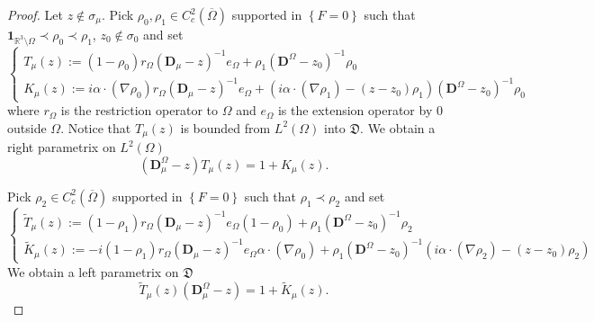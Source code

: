 \documentclass[a4paper, 12pt]{amsart}
\numberwithin{equation}{section}
\newcommand{\R}{\mathbb{R}} %
\newcommand{\lp}{\left(} %
\newcommand{\rp}{\right)} %
\newcommand{\lcb}{\left\lbrace} %
\newcommand{\rcb}{\right\rbrace} %
\newcommand{\indic}{\mathbf{1}} %
\newcommand{\Dvec}{\mathbf{D}}
\newcommand{\Dfrak}{\mathfrak{D}}
\begin{document}
\begin{proof} 
    Let $z\not\in\sigma_\mu$. Pick $\rho_0,\rho_1\in C^2_c(\overline{\Omega})$ supported in $\lcb F=0\rcb$ such that $\indic_{\R^3\setminus\Omega}\prec\rho_0\prec\rho_1$, $z_0\not\in\sigma_0$ and set
    \begin{equation*}
        \left\{
        \begin{array}{ll}
            T_\mu(z):=(1-\rho_0)r_\Omega(\Dvec_\mu-z)^{-1}e_\Omega+\rho_1(\Dvec^\Omega-z_0)^{-1}\rho_0\\
            
            K_\mu(z):=i\alpha\cdot(\nabla\rho_0)r_\Omega(\Dvec_\mu-z)^{-1}e_\Omega+\lp i\alpha\cdot(\nabla\rho_1)-(z-z_0)\rho_1\rp(\Dvec^\Omega-z_0)^{-1}\rho_0
        \end{array}
        \right.
    \end{equation*}
    where $r_\Omega$ is the restriction operator to $\Omega$ and $e_\Omega$ is the extension operator by $0$ outside $\Omega$. Notice that $T_\mu(z)$ is bounded from $L^2(\Omega)$ into $\Dfrak$. We obtain a right parametrix on $L^2(\Omega)$
    \begin{equation}\label{RightParametrix}
        (\Dvec_\mu^\Omega-z)T_\mu(z)=1+K_\mu(z).
    \end{equation}

    Pick $\rho_2\in C^2_c(\overline{\Omega})$ supported in $\lcb F=0\rcb$ such that $\rho_1\prec\rho_2$ and set 
    \begin{equation*}
        \left\{
        \begin{array}{ll}
            \tilde{T}_\mu(z):=(1-\rho_1)r_\Omega(\Dvec_\mu-z)^{-1}e_\Omega(1-\rho_0)+\rho_1(\Dvec^\Omega-z_0)^{-1}\rho_2\\
            
            \tilde{K}_\mu(z):=-i(1-\rho_1)r_\Omega(\Dvec_\mu-z)^{-1}e_\Omega\alpha\cdot(\nabla\rho_0)+\rho_1(\Dvec^\Omega-z_0)^{-1}\lp i\alpha\cdot(\nabla\rho_2)-(z-z_0)\rho_2\rp
        \end{array}
        \right.
    \end{equation*}
    We obtain a left parametrix on $\Dfrak$
    \begin{equation}\label{LeftParametrix}
        \tilde{T}_\mu(z)(\Dvec_\mu^\Omega-z)=1+\tilde{K}_\mu(z).
    \end{equation}
    

\end{proof}
\end{document}
